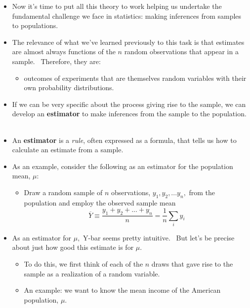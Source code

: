 \documentclass[11pt]{article}
\begin{document}
\begin{itemize}
\item Now it's time to put all this theory to work helping us undertake the
fundamental challenge we face in statistics: making inferences from samples
to populations.

\item The relevance of what we've learned previously to this task is that
estimates are almost always functions of the $n$ random observations that
appear in a sample. \ Therefore, they are:

\begin{itemize}
\item outcomes of experiments that are themselves random variables with
their own probability distributions.
\end{itemize}

\item If we can be very specific about the process giving rise to the
sample, we can develop an \textbf{estimator} to make inferences from the
sample to the population. \ 

\item An \textbf{estimator }is a \textit{rule}, often expressed as a
formula, that tells us how to calculate an estimate from a sample.

\item As an example, consider the following as an estimator for the
population mean, $\mu :$

\begin{itemize}
\item Draw a random sample of $n$ observations, $y_{1},y_{2},...y_{n},$ from
the population and employ the observed sample mean%
\begin{equation*}
\overline{Y}\equiv \frac{y_{1}+y_{2}+...+y_{n}}{n}=\frac{1}{n}\sum_{i}y_{i}
\end{equation*}
\end{itemize}

\item As an estimator for $\mu ,$ Y-bar seems pretty intuitive. \ But let's
be precise about just how good this estimate is for $\mu .$

\begin{itemize}
\item To do this, we first think of each of the $n$ draws that gave rise to
the sample as a realization of a random variable. \ 

\item An example: we want to know the mean income of the American
population, $\mu .$


\end{itemize}
\end{itemize}
\end{document}
